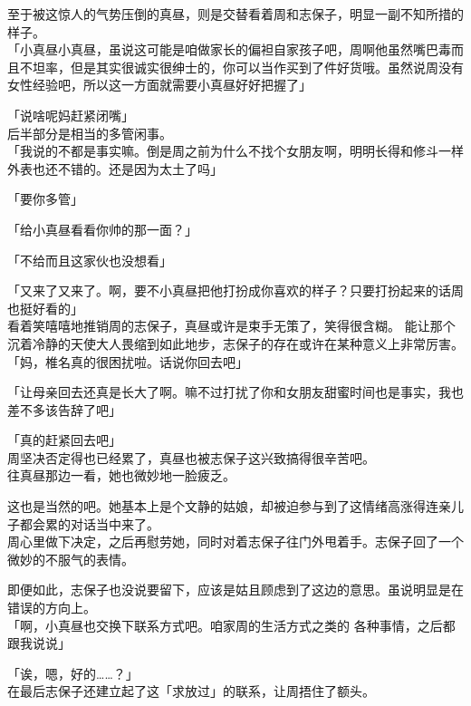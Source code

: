 至于被这惊人的气势压倒的真昼，则是交替看着周和志保子，明显一副不知所措的样子。\\

「小真昼小真昼，虽说这可能是咱做家长的偏袒自家孩子吧，周啊他虽然嘴巴毒而且不坦率，但是其实很诚实很绅士的，你可以当作买到了件好货哦。虽然说周没有女性经验吧，所以这一方面就需要小真昼好好把握了」

「说啥呢妈赶紧闭嘴」\\

后半部分是相当的多管闲事。\\

「我说的不都是事实嘛。倒是周之前为什么不找个女朋友啊，明明长得和修斗一样外表也还不错的。还是因为太土了吗」

「要你多管」

「给小真昼看看你帅的那一面？」

「不给而且这家伙也没想看」

「又来了又来了。啊，要不小真昼把他打扮成你喜欢的样子？只要打扮起来的话周也挺好看的」\\

看着笑嘻嘻地推销周的志保子，真昼或许是束手无策了，笑得很含糊。
能让那个沉着冷静的天使大人畏缩到如此地步，志保子的存在或许在某种意义上非常厉害。\\

「妈，椎名真的很困扰啦。话说你回去吧」

「让母亲回去还真是长大了啊。嘛不过打扰了你和女朋友甜蜜时间也是事实，我也差不多该告辞了吧」

「真的赶紧回去吧」\\

周坚决否定得也已经累了，真昼也被志保子这兴致搞得很辛苦吧。\\

往真昼那边一看，她也微妙地一脸疲乏。

这也是当然的吧。她基本上是个文静的姑娘，却被迫参与到了这情绪高涨得连亲儿子都会累的对话当中来了。\\

周心里做下决定，之后再慰劳她，同时对着志保子往门外甩着手。志保子回了一个微妙的不服气的表情。

即便如此，志保子也没说要留下，应该是姑且顾虑到了这边的意思。虽说明显是在错误的方向上。\\

「啊，小真昼也交换下联系方式吧。咱家周的生活方式之类的 各种事情，之后都跟我说说」

「诶，嗯，好的……？」\\

在最后志保子还建立起了这「求放过」的联系，让周捂住了额头。\\

